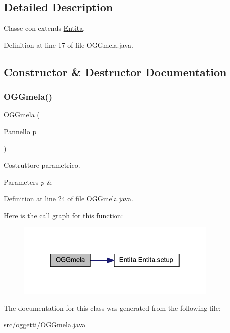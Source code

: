 \subsection{Detailed Description}
Classe con extends \hyperlink{namespace_entita}{Entita}. 

Definition at line 17 of file O\+G\+Gmela.\+java.



\subsection{Constructor \& Destructor Documentation}
\mbox{\label{classoggetti_1_1_o_g_gmela_a3f758bed86524b65271eb844b67680be}} 
\subsubsection{\texorpdfstring{O\+G\+Gmela()}{OGGmela()}}
{\footnotesize\ttfamily \hyperlink{classoggetti_1_1_o_g_gmela}{O\+G\+Gmela} (\begin{DoxyParamCaption}\item[{\hyperlink{classa_1_1survival_1_1game_1_1_pannello}{Pannello}}]{p }\end{DoxyParamCaption})}



Costruttore parametrico. 


\begin{DoxyParams}{Parameters}
{\em p} & \\
\hline
\end{DoxyParams}


Definition at line 24 of file O\+G\+Gmela.\+java.

Here is the call graph for this function\+:
\nopagebreak
\begin{figure}[H]
\begin{center}
\leavevmode
\includegraphics[width=274pt]{classoggetti_1_1_o_g_gmela_a3f758bed86524b65271eb844b67680be_cgraph}
\end{center}
\end{figure}


The documentation for this class was generated from the following file\+:\begin{DoxyCompactItemize}
\item 
src/oggetti/\hyperlink{_o_g_gmela_8java}{O\+G\+Gmela.\+java}\end{DoxyCompactItemize}
